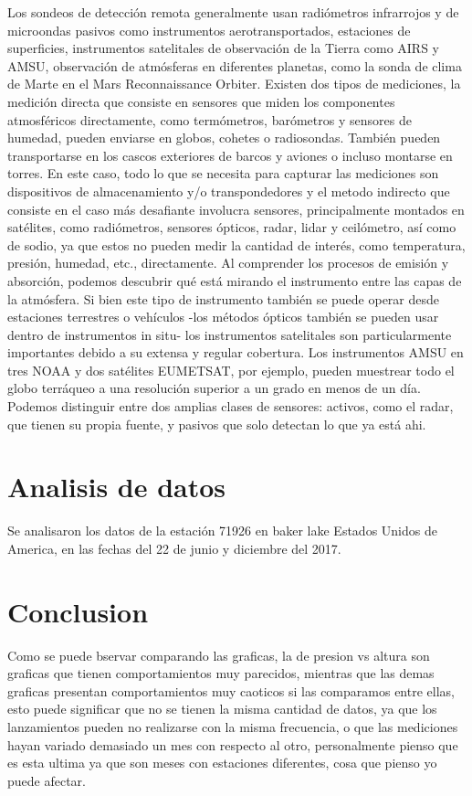 \documentclass{article}
\begin{document}
Los sondeos de detección remota generalmente usan radiómetros infrarrojos y de microondas pasivos como instrumentos aerotransportados, estaciones de superficies, instrumentos satelitales de observación de la Tierra como AIRS y AMSU, observación de atmósferas en diferentes planetas, como la sonda de clima de Marte en el Mars Reconnaissance Orbiter.
\newline
Existen dos tipos de mediciones, la medición directa que consiste en sensores que miden los componentes atmosféricos directamente, como termómetros, barómetros y sensores de humedad, pueden enviarse en globos, cohetes o radiosondas. También pueden transportarse en los cascos exteriores de barcos y aviones o incluso montarse en torres. En este caso, todo lo que se necesita para capturar las mediciones son dispositivos de almacenamiento y/o transpondedores y el metodo indirecto que consiste en el caso más desafiante involucra sensores, principalmente montados en satélites, como radiómetros, sensores ópticos, radar, lidar y ceilómetro, así como de sodio, ya que estos no pueden medir la cantidad de interés, como temperatura, presión, humedad, etc., directamente. Al comprender los procesos de emisión y absorción, podemos descubrir qué está mirando el instrumento entre las capas de la atmósfera. Si bien este tipo de instrumento también se puede operar desde estaciones terrestres o vehículos -los métodos ópticos también se pueden usar dentro de instrumentos in situ- los instrumentos satelitales son particularmente importantes debido a su extensa y regular cobertura. Los instrumentos AMSU en tres NOAA y dos satélites EUMETSAT, por ejemplo, pueden muestrear todo el globo terráqueo a una resolución superior a un grado en menos de un día.
Podemos distinguir entre dos amplias clases de sensores: activos, como el radar, que tienen su propia fuente, y pasivos que solo detectan lo que ya está ahi.

\section{Analisis de datos}
Se analisaron los datos de la estación 71926 en baker lake Estados Unidos de America, en las fechas del 22 de junio y diciembre del 2017.

\section{Conclusion}
Como se puede bservar comparando las graficas, la de presion vs altura son graficas que tienen comportamientos muy parecidos, mientras que las demas graficas presentan comportamientos muy caoticos si las comparamos entre ellas, esto puede significar que no se tienen la misma cantidad de datos, ya que los lanzamientos pueden no realizarse con la misma frecuencia, o que las mediciones hayan variado demasiado un mes con respecto al otro, personalmente pienso que es esta ultima ya que son meses con estaciones diferentes, cosa que pienso yo puede afectar.
\end{document}
